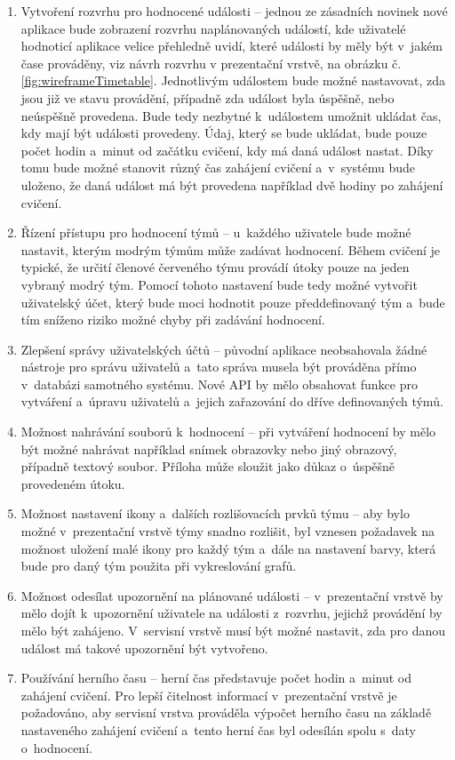 \documentclass[
  digital,
  twoside,
  table, 
  nolof, 
  nolot
]{fithesis3}
\begin{document}
\begin{enumerate}
\item Vytvoření rozvrhu pro hodnocené události -- jednou ze zásadních novinek nové aplikace bude zobrazení rozvrhu naplánovaných událostí, kde uživatelé hodnoticí aplikace velice přehledně uvidí, které události by měly být v~jakém čase prováděny, viz návrh rozvrhu v prezentační vrstvě, na obrázku č. \ref{fig:wireframeTimetable}. Jednotlivým událostem bude možné nastavovat, zda jsou již ve stavu provádění, případně zda událost byla úspěšně, nebo neúspěšně provedena. Bude tedy nezbytné k~událostem umožnit ukládat čas, kdy mají být události provedeny. Údaj, který se bude ukládat, bude pouze počet hodin a~minut od začátku cvičení, kdy má daná událost nastat. Díky tomu bude možné stanovit různý čas zahájení cvičení a~v~systému bude uloženo, že daná událost má být provedena například dvě hodiny po zahájení cvičení.
\item Řízení přístupu pro hodnocení týmů -- u~každého uživatele bude možné nastavit, kterým modrým týmům může zadávat hodnocení. Během cvičení je typické, že určití členové červeného týmu provádí útoky pouze na jeden vybraný modrý tým. Pomocí tohoto nastavení bude tedy možné vytvořit uživatelský účet, který bude moci hodnotit pouze předdefinovaný tým a~bude tím sníženo riziko možné chyby při zadávání hodnocení.
\item Zlepšení správy uživatelských účtů -- původní aplikace neobsahovala žádné nástroje pro správu uživatelů a~tato správa musela být prováděna přímo v~databázi samotného systému. Nové API by mělo obsahovat funkce pro vytváření a~úpravu uživatelů a~jejich zařazování do dříve definovaných týmů.
\item Možnost nahrávání souborů k~hodnocení -- při vytváření hodnocení by mělo být možné nahrávat například snímek obrazovky nebo jiný obrazový, případně textový soubor. Příloha může sloužit jako důkaz o~úspěšně provedeném útoku.
\item Možnost nastavení ikony a~dalších rozlišovacích prvků týmu -- aby bylo možné v~prezentační vrstvě týmy snadno rozlišit, byl vznesen požadavek na možnost uložení malé ikony pro každý tým a~dále na nastavení barvy, která bude pro daný tým použita při vykreslování grafů.
\item Možnost odesílat upozornění na plánované události -- v~prezentační vrstvě by mělo dojít k~upozornění uživatele na události z~rozvrhu, jejichž provádění by mělo být zahájeno. V~servisní vrstvě musí být možné nastavit, zda pro danou událost má takové upozornění být vytvořeno.
\label{pozadavek6}
\item Používání herního času -- herní čas představuje počet hodin a~minut od zahájení cvičení. Pro lepší čitelnost informací v~prezentační vrstvě je požadováno, aby servisní vrstva prováděla výpočet herního času na základě nastaveného zahájení cvičení a~tento herní čas byl odesílán spolu s~daty o~hodnocení.
\end{enumerate}
\end{document}
